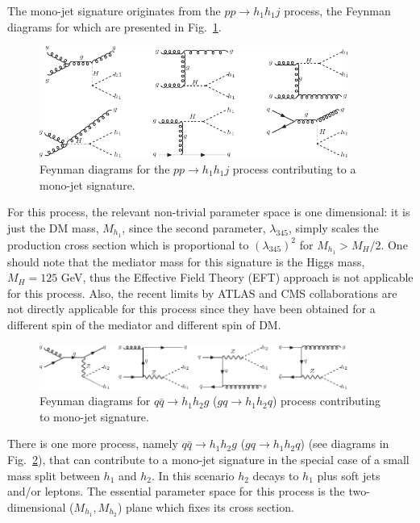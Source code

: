 \documentclass[12pt,a4paper]{article}
\newcommand {\blue} {\color{blue}}
\newcommand{\giac}[2]{{\blue #1 #2}}
\begin{document}
The mono-jet signature originates from the $pp\to h_1 h_1j$ process,
the Feynman diagrams for which are presented in Fig.~\ref{fig:fd-monojet1}.
\begin{figure}[htb!]
\begin{center}
\includegraphics[width=0.9\textwidth]{fd-mono-j1.pdf} 
\caption{Feynman diagrams for the $pp\to h_1 h_1j$ process
contributing to a mono-jet signature.}
\label{fig:fd-monojet1}
\end{center}
\end{figure}
For this process, the relevant non-trivial  parameter space is  one dimensional:
it is just the DM mass, $M_{h_1}$,  since the second parameter, $\lambda_{345}$,
simply scales the production cross section which is proportional to  $(\lambda_{345})^2$
for $M_{h_1}>M_H/2$.
One should note  that the mediator mass for this signature is the Higgs mass, $M_H = 125$ GeV, thus
the Effective Field Theory (EFT) approach is not applicable for this process. Also, the recent limits by ATLAS
\cite{Diehl:2014dda} and CMS \cite{Chatrchyan:2012me, Khachatryan:2014rra} collaborations  are not directly
applicable for this process since they have been obtained for a different spin of the mediator and different
spin of DM. 

\begin{figure}[htb!]
\begin{center}
\includegraphics[width=0.9\textwidth]{fd-mono-j2.pdf} 
\caption{Feynman diagrams for $q\bar{q}\to h_1 h_2g$ ($gq\to h_1 h_2q$) process 
contributing to mono-jet signature.}
\label{fig:fd-monojet2}
\end{center}
\end{figure}

There is one more process, namely $q\bar{q}\to
h_1 h_2g$ ($gq\to h_1 h_2q$) (see diagrams in 
Fig.~\ref{fig:fd-monojet2}),  that can contribute to a mono-jet signature in the special case of a small mass split between $h_1$ and $h_2$.
In this scenario $h_2$ decays to $h_1$ plus soft 
jets and/or leptons. 
The essential parameter space for this process is the
two-dimensional  ($M_{h_1},M_{h_2}$) plane
which fixes its cross section.
\end{document}

